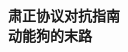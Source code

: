 \documentclass[11pt]{article}
\begin{document}
    \begin{titlepage}
        \begin{center}
            \vspace*{1cm}
            \Large{\textbf{肃正协议对抗指南}}\\[2mm]
            \large{\textbf{动能狗的末路}}
        \end{center}
    \end{titlepage}
 
    
\end{document}

